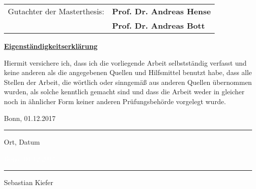 \thispagestyle{empty}
\begin{center}
\begin{tabular}{ l l }
Gutachter der Masterthesis: & \textbf{Prof. Dr. Andreas Hense} \\

& \textbf{Prof. Dr. Andreas Bott} \\
\end{tabular}
\end{center}


\vspace*{\fill}
\large{\textbf{\underline{Eigenständigkeitserklärung}}}
\normalsize

\vskip 1cm

\noindent
Hiermit versichere ich, dass ich die vorliegende Arbeit selbstständig verfasst und keine anderen als die angegebenen Quellen und Hilfsmittel benutzt habe, dass alle Stellen der Arbeit, die wörtlich oder sinngemäß aus anderen Quellen übernommen wurden, als solche kenntlich gemacht sind und dass die Arbeit weder in gleicher noch in ähnlicher Form keiner anderen Prüfungsbehörde vorgelegt wurde.

\vskip 2cm

\parbox{5.5cm}{\centering Bonn, 01.12.2017
{\hrule height .5pt}
\strut \centering\footnotesize Ort, Datum} \hfill
\parbox{5.5cm}{\centering \textcolor{white}{\centering Bonn, 01.12.2017} 
{\hrule height.5pt}
\strut \centering\footnotesize Sebastian Kiefer}
 
